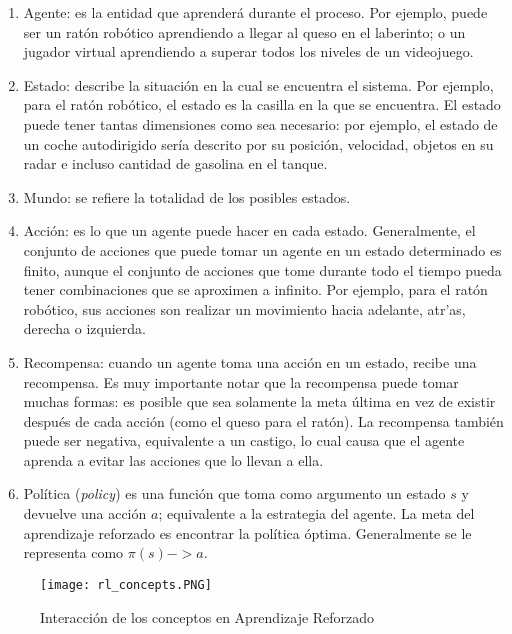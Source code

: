 \begin{enumerate}
    \item Agente: es la entidad que aprender\'a durante el proceso. Por ejemplo, puede ser un rat\'on rob\'otico aprendiendo a llegar al queso en el laberinto; o un jugador virtual aprendiendo a superar todos los niveles de un videojuego.
    \item Estado: describe la situaci\'on en la cual se encuentra el sistema. Por ejemplo, para el rat\'on rob\'otico, el estado es la casilla en la que se encuentra. El estado puede tener tantas dimensiones como sea necesario: por ejemplo, el estado de un coche autodirigido ser\'ia descrito por su posici\'on, velocidad, objetos en su radar e incluso cantidad de gasolina en el tanque.
    \item Mundo: se refiere la totalidad de los posibles estados.
    \item Acci\'on: es lo que un agente puede hacer en cada estado. Generalmente, el conjunto de acciones que puede tomar un agente en un estado determinado es finito, aunque el conjunto de acciones que tome durante todo el tiempo pueda tener combinaciones que se aproximen a infinito. Por ejemplo, para el rat\'on rob\'otico, sus acciones son realizar un movimiento hacia adelante, atr'as, derecha o izquierda.
    \item Recompensa: cuando un agente toma una acci\'on en un estado, recibe una recompensa. Es muy importante notar que la recompensa puede tomar muchas formas: es posible que sea solamente la meta \'ultima en vez de existir despu\'es de cada acci\'on (como el queso para el rat\'on). La recompensa tambi\'en puede ser negativa, equivalente a un castigo, lo cual causa que el agente aprenda a evitar las acciones que lo llevan a ella.
    \item Pol\'itica (\textit{policy}) es una funci\'on que toma como argumento un estado $s$ y devuelve una acci\'on $a$; equivalente a la estrategia del agente. La meta del aprendizaje reforzado es encontrar la pol\'itica \'optima. Generalmente se le representa como $\pi(s)->a$.
\end{enumerate}

\begin{figure}[ht]
\caption{Interacci\'on de los conceptos en Aprendizaje Reforzado}
\label{rl_concepts}
\texttt{[image: rl\_concepts.PNG]}
\centering
\end{figure}

